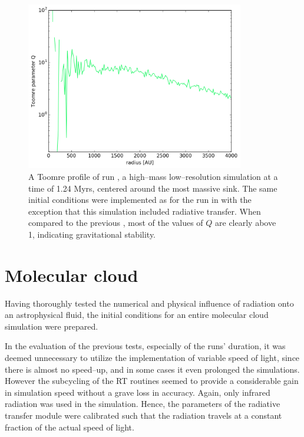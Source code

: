 \begin{figure}[!htb]
 \centering
 \includegraphics[width=0.85\textwidth]{Figures/toomre_rt}
 \captionsetup{justification=justified,singlelinecheck=false,width=\linewidth}
 \decoRule
 \caption[Toomre profile of a radiative transfer run]{A Toomre profile of run , a high--mass low--resolution simulation at a time of 1.24 Myrs, centered around the most massive sink.
                                                      The same initial conditions were implemented as for the run in  with the exception that this simulation included radiative transfer.
                                                      When compared to the previous , most of the values of $Q$ are clearly above 1, indicating gravitational stability.}
\label{fig:Toomre_rt}
\end{figure}
\FloatBarrier


\section{Molecular cloud}
\label{sec:MC}

Having thoroughly tested the numerical and physical influence of radiation onto an astrophysical fluid, the initial conditions for an entire molecular cloud simulation were prepared.

In the evaluation of the previous tests, especially of the runs' duration, it was deemed unnecessary to utilize the implementation of variable speed of light, since there is almost no speed--up, and in some cases it even prolonged the simulations.
However the subcycling of the RT routines seemed to provide a considerable gain in simulation speed without a grave loss in accuracy.
Again, only infrared radiation was used in the simulation.
Hence, the parameters of the radiative transfer module were calibrated such that the radiation travels at a constant fraction of the actual speed of light.

